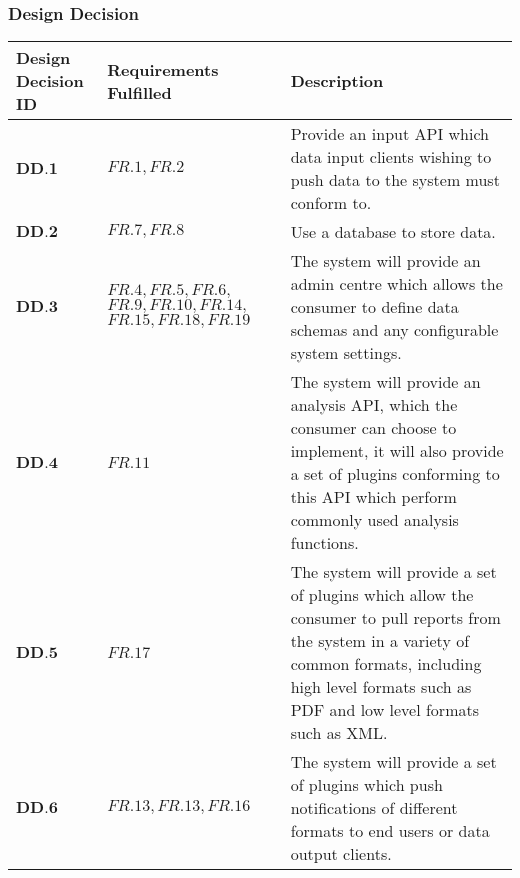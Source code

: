 \subsubsection{Design Decision}
\vspace{-0.5cm}
\begin{longtable}[H]{ | p{2cm} | p{3.5cm} | p{11cm} | }
		\hline
			\cellcolor{titleColor}\textbf{Design Decision ID}&	\cellcolor{titleColor}\textbf{Requirements Fulfilled}&	\cellcolor{titleColor}\textbf{Description}	\\ \hline
			$\textbf{DD.1}$&	$FR.1,FR.2$&	Provide an input API which data input clients wishing to push data to the system must conform to.	\\ \hline
			$\textbf{DD.2}$&	$FR.7,FR.8$ &	Use a database to store data.	\\ \hline
			$\textbf{DD.3}$ &	$FR.4,FR.5,FR.6, $
			$FR.9,FR.10,FR.14, $
			$FR.15,FR.18,FR.19$ &	The system will provide an admin centre which allows the consumer to define data schemas and any configurable system settings.	\\ \hline
			$\textbf{DD.4}$&	$FR.11$&	The system will provide an analysis API, which the consumer can choose to implement, it will also provide a set of plugins conforming to this API which perform commonly used analysis functions.	\\ \hline
			$\textbf{DD.5}$&	$FR.17$ &	The system will provide a set of plugins which allow the consumer to pull reports from the system in a variety of common formats, including high level formats such as PDF and low level formats such as XML.	\\ \hline
			$\textbf{DD.6}$&	$FR.13, FR.13, FR.16$ &	The system will provide a set of plugins which push notifications of different formats to end users or data output clients.	\\ \hline
\end{longtable}
